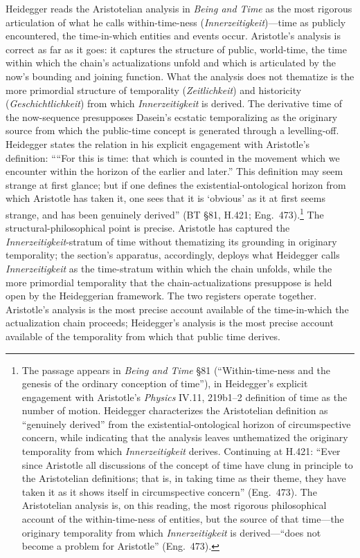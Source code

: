 Heidegger reads the Aristotelian analysis in \textit{Being and Time} as the most rigorous articulation of what he calls within-time-ness (\textit{Innerzeitigkeit})---time as publicly encountered, the time-in-which entities and events occur. Aristotle's analysis is correct as far as it goes: it captures the structure of public, world-time, the time within which the chain's actualizations unfold and which is articulated by the now's bounding and joining function. What the analysis does not thematize is the more primordial structure of temporality (\textit{Zeitlichkeit}) and historicity (\textit{Geschichtlichkeit}) from which \textit{Innerzeitigkeit} is derived. The derivative time of the now-sequence presupposes Dasein's ecstatic temporalizing as the originary source from which the public-time concept is generated through a levelling-off. Heidegger states the relation in his explicit engagement with Aristotle's definition: ````For this is time: that which is counted in the movement which we encounter within the horizon of the earlier and later.'' This definition may seem strange at first glance; but if one defines the existential-ontological horizon from which Aristotle has taken it, one sees that it is `obvious' as it at first seems strange, and has been genuinely derived'' (BT \S 81, H.421; Eng.~473).\footnote{The passage appears in \textit{Being and Time} \S 81 (``Within-time-ness and the genesis of the ordinary conception of time''), in Heidegger's explicit engagement with Aristotle's \textit{Physics} IV.11, 219b1--2 definition of time as the number of motion. Heidegger characterizes the Aristotelian definition as ``genuinely derived'' from the existential-ontological horizon of circumspective concern, while indicating that the analysis leaves unthematized the originary temporality from which \textit{Innerzeitigkeit} derives. Continuing at H.421: ``Ever since Aristotle all discussions of the concept of time have clung in principle to the Aristotelian definitions; that is, in taking time as their theme, they have taken it as it shows itself in circumspective concern'' (Eng.~473). The Aristotelian analysis is, on this reading, the most rigorous philosophical account of the within-time-ness of entities, but the source of that time---the originary temporality from which \textit{Innerzeitigkeit} is derived---``does not become a problem for Aristotle'' (Eng.~473).} The structural-philosophical point is precise. Aristotle has captured the \textit{Innerzeitigkeit}-stratum of time without thematizing its grounding in originary temporality; the section's apparatus, accordingly, deploys what Heidegger calls \textit{Innerzeitigkeit} as the time-stratum within which the chain unfolds, while the more primordial temporality that the chain-actualizations presuppose is held open by the Heideggerian framework. The two registers operate together. Aristotle's analysis is the most precise account available of the time-in-which the actualization chain proceeds; Heidegger's analysis is the most precise account available of the temporality from which that public time derives.

